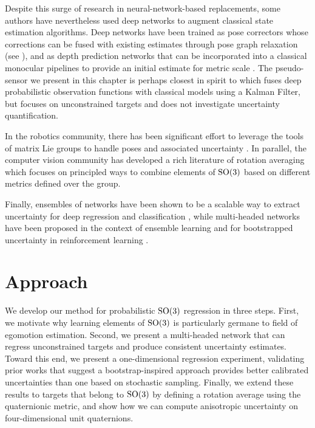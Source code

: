 Despite this surge of research in neural-network-based replacements, some authors have nevertheless used deep networks to augment classical state estimation algorithms. Deep networks have been trained as pose correctors whose corrections can be fused with existing estimates through pose graph relaxation \citep{2018_Peretroukhin_Deep} (see ), and as  depth prediction networks that can be incorporated into a classical monocular pipelines to provide an initial estimate for metric scale \citep{yang:2018}. The pseudo-sensor we present in this chapter is perhaps closest in spirit to \citep{Haarnoja2016-ph} which fuses deep probabilistic observation functions with classical models using a Kalman Filter, but focuses on unconstrained targets and does not investigate uncertainty quantification.

In the robotics community, there has been significant effort to leverage the tools of matrix Lie groups to handle poses and associated uncertainty \citep{Sola2018-kg, Barfoot2014-ac}. In parallel, the computer vision community has developed a rich literature of rotation averaging \citep{Hartley2013-rc} which focuses on principled ways to combine elements of $\mathrm{SO}(3)$ based on different metrics defined over the group.

Finally, ensembles of networks have been shown to be a scalable way to extract uncertainty for deep regression and classification  \citep{Lakshminarayanan2017}, while multi-headed networks have been proposed in the context of ensemble learning \citep{Lee2015-af} and for bootstrapped uncertainty in reinforcement learning \citep{Osband2016}. 

\section{Approach}

We develop our method for probabilistic $\mathrm{SO}(3)$ regression in three steps. 
First, we motivate why learning elements of $\mathrm{SO}(3)$ is particularly germane to field of egomotion estimation. Second, we present a multi-headed network that can regress unconstrained targets and produce consistent uncertainty estimates. Toward this end, we present a one-dimensional regression experiment, validating prior works \citep{Lakshminarayanan2017,Osband2016} that suggest a bootstrap-inspired approach provides better calibrated uncertainties than one based on stochastic sampling. Finally, we extend these results to targets that belong to $\mathrm{SO}(3)$ by defining a rotation average using the quaternionic metric, and show how we can compute anisotropic uncertainty on four-dimensional unit quaternions.

